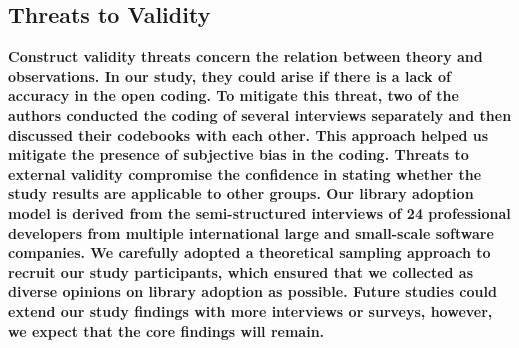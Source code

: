 \subsection{Threats to Validity}
\bf{Construct validity} threats concern the relation between theory
and observations. In our study, they could arise if there is a lack of accuracy in the open coding. To mitigate this threat, two of the authors conducted the coding of several interviews separately and then discussed their codebooks with each other. This approach helped us mitigate the presence of subjective bias in the coding. Threats to \bf{external validity} compromise the confidence in
stating whether the study results are applicable to other
groups. Our library adoption model is derived from the semi-structured interviews of 24 professional developers from multiple international large and small-scale software companies. We carefully adopted a theoretical sampling approach to recruit our study participants, which ensured that we collected as diverse opinions on library adoption as possible. Future studies could extend our study findings with more interviews or surveys, however, we expect that the core findings will remain.


